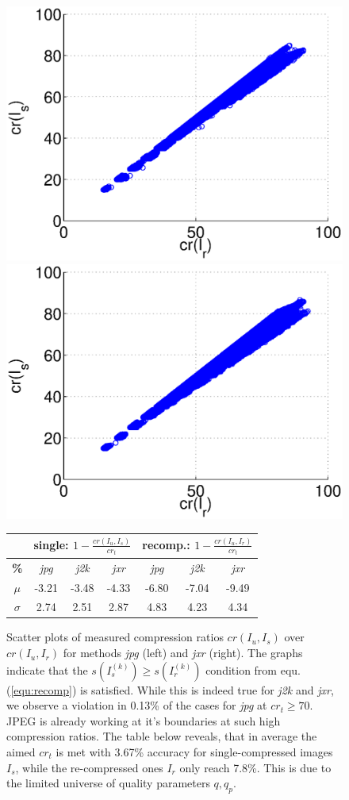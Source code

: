 \documentclass[10pt,twocolumn,letterpaper]{article}
\begin{document}
\begin{figure}
	\begin{small}
	
	\includegraphics[width=0.45\linewidth]{img/jpgData.eps}
	\includegraphics[width=0.45\linewidth]{img/jxrData.eps}
	
	\vspace{3mm}
	\begin{tabular}{c|c|c|c||c|c|c}
		& \multicolumn{3}{c||}{single: $1-\frac{cr(I_u, I_s)}{cr_t}$ } & \multicolumn{3}{c}{recomp.: $ 1-\frac{cr(I_u, I_r)}{cr_t}$} \\
		\hline
		\textbf{\%} & \emph{jpg} & \emph{j2k} & \emph{jxr} & \emph{jpg} & \emph{j2k} & \emph{jxr} \\
		\hline
		$ \mu $ & -3.21 & -3.48	&  -4.33 &  -6.80&   -7.04 &   -9.49 \\
		$ \sigma$ &2.74 &2.51 &  2.87 & 4.83  & 4.23  & 4.34 \\
	\end{tabular}
	
	
	\vspace{2mm}
	
	\end{small}
	
	\caption{Scatter plots of measured compression ratios $cr(I_u, I_s)$ over $cr(I_u, I_r)$ for methods \emph{jpg} (left) and \emph{jxr} (right). The graphs indicate that the $s(I_s^{(k)}) \geq s(I_r^{(k)})$ condition from equ. (\ref{equ:recomp}) is satisfied. While this is indeed true for \emph{j2k} and \emph{jxr}, we observe a violation in 0.13\% of the cases for \emph{jpg} at $cr_t \geq 70$. JPEG is already working at it's boundaries at such high compression ratios. The table below reveals, that in average the aimed $cr_t$ is met with 3.67\% accuracy for single-compressed images $I_s$, while the re-compressed ones $I_r$ only reach 7.8\%. This is due to the limited universe of quality parameters $q, q_p$.}
	
	
	\label{fig:dataDistribution}
\end{figure}
\end{document}
